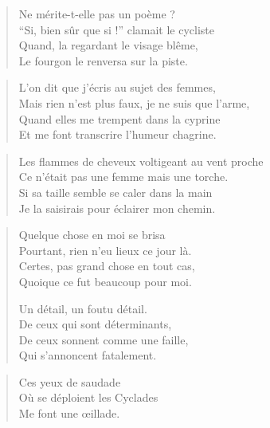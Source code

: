 
\begin{verse}
Ne mérite-t-elle pas un poème ?\\
\enquote{Si, bien sûr que si !} clamait le cycliste\\
Quand, la regardant le visage blême,\\
Le fourgon le renversa sur la piste.
\end{verse}


\begin{verse}
L’on dit que j’écris au sujet des femmes,\\
Mais rien n’est plus faux, je ne suis que l’arme,\\
Quand elles me trempent dans la cyprine\\
Et me font transcrire l’humeur chagrine.
\end{verse}

\begin{verse}
Les flammes de cheveux voltigeant au vent proche\\
Ce n’était pas une femme mais une torche.\\
Si sa taille semble se caler dans la main\\
Je la saisirais pour éclairer mon chemin.
\end{verse}

\begin{verse}
Quelque chose en moi se brisa\\
Pourtant, rien n’eu lieux ce jour là.\\
Certes, pas grand chose en tout cas,\\
Quoique ce fut beaucoup pour moi.

Un détail, un foutu détail.\\
De ceux qui sont déterminants,\\
De ceux sonnent comme une faille,\\
Qui s’annoncent fatalement.
\end{verse}

\begin{verse}
Ces yeux de saudade\\
Où se déploient les Cyclades\\
Me font une œillade.
\end{verse}

